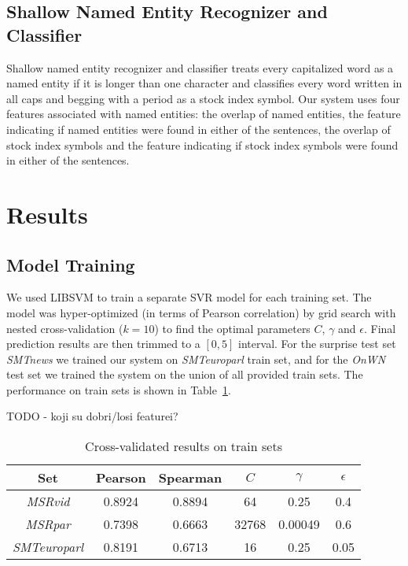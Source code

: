 \documentclass[10pt, a4paper]{article}
\begin{document}
\subsection{Shallow Named Entity Recognizer and Classifier}
Shallow named entity recognizer and classifier treats every capitalized word as a named entity if it is longer than one character and classifies every word written in all caps and begging with a period as a stock index symbol. Our system uses four features associated with named entities: the overlap of named entities, the feature indicating if named entities were found in either of the sentences, the overlap of stock index symbols and the feature indicating if stock index symbols were found in either of the sentences.

\section{Results}

\subsection{Model Training}

We used LIBSVM \citep{chang2011libsvm} to train a separate SVR model for each training set. The model was hyper-optimized (in terms of Pearson correlation) by grid search with nested cross-validation ($k=10$) to find the optimal parameters $C$, $\gamma$ and $\epsilon$. Final prediction results are then trimmed to a $[0,5]$ interval. For the surprise test set \textit{SMTnews} we trained our system on \textit{SMTeuroparl} train set, and for the \textit{OnWN} test set we trained the system on the union of all provided train sets. The performance on train sets is shown in Table~\ref{tab:train-results-table}.

TODO - koji su dobri/losi featurei?

\begin{table}[h]
\caption{Cross-validated results on train sets}
\label{tab:train-results-table}
\begin{center}
\begin{tabular}{cccccc}
\toprule
Set & Pearson & Spearman & $C$ & $\gamma$ & $\epsilon$ \\
\midrule
\textit{MSRvid} & 0.8924 & 0.8894 & 64 & 0.25 & 0.4 \\
\textit{MSRpar} & 0.7398 & 0.6663 & 32768 & 0.00049 & 0.6 \\
\textit{SMTeuroparl} & 0.8191 & 0.6713 & 16 & 0.25 & 0.05 \\
\bottomrule
\end{tabular}
\end{center}
\end{table}
\end{document}
